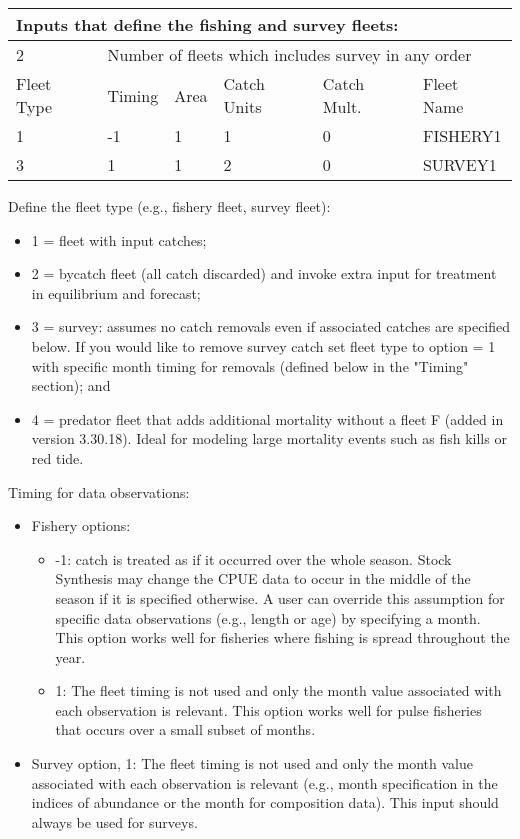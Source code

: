 \begin{center}
	\begin{tabular}{p{2cm} p{2cm} p{2cm} p{2cm} p{2cm} p{4cm} }
		\multicolumn{6}{l}{Inputs that define the fishing and survey fleets:}\\
		\hline
		2 & \multicolumn{5}{l}{Number of fleets which includes survey in any order} \Tstrut\Bstrut\\

		\hline
		Fleet Type & Timing & Area & Catch Units & Catch Mult. & Fleet Name \Tstrut\Bstrut\\

		\hline
		1 & -1 & 1 & 1 & 0 & FISHERY1 \Tstrut\\
		3 &  1 & 1 & 2 & 0 & SURVEY1 \Bstrut\\
		\hline
		
	\end{tabular}
\end{center}

Define the fleet type (e.g., fishery fleet, survey fleet):
	  \begin{itemize}
	  	\item 1 = fleet with input catches;
	  	\item 2 = bycatch fleet (all catch discarded) and invoke extra input for treatment in equilibrium and forecast;
	  	\item 3 = survey: assumes no catch removals even if associated catches are specified below.  If you would like to remove survey catch set fleet type to option = 1 with specific month timing for removals (defined below in the "Timing" section); and 
	  	\item 4 = predator fleet that adds additional mortality without a fleet F (added in version 3.30.18). Ideal for modeling large mortality events such as fish kills or red tide. 
	  \end{itemize}

\hypertarget{ObsTiming}{}
   Timing for data observations:
	  \begin{itemize}
	  	\item Fishery options:
		\begin{itemize}
		    \item -1: catch is treated as if it occurred over the whole season. Stock Synthesis may change the CPUE data to occur in the middle of the season if it is specified otherwise. A user can override this assumption for specific data observations (e.g., length or age) by specifying a month. This option works well for fisheries where fishing is spread throughout the year.
			\item 1: The fleet timing is not used and only the month value associated with each observation is relevant. This option works well for pulse fisheries that occurs over a small subset of months.
		\end{itemize}
	  	\item Survey option, 1: The fleet timing is not used and only the month value associated with each observation is relevant (e.g., month specification in the indices of abundance or the month for composition data). This input should always be used for surveys.
	  \end{itemize}	  
	  
